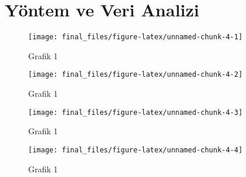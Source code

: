 \documentclass[
  12pt,
]{article}
\begin{document}
\hypertarget{yuxf6ntem-ve-veri-analizi}{%
\section{Yöntem ve Veri Analizi}\label{yuxf6ntem-ve-veri-analizi}}

\begin{figure}

{\centering \texttt{[image: final\_files/figure-latex/unnamed-chunk-4-1]} 

}

\caption{Grafik 1}\label{fig:unnamed-chunk-4-1}
\end{figure}
\begin{figure}

{\centering \texttt{[image: final\_files/figure-latex/unnamed-chunk-4-2]} 

}

\caption{Grafik 1}\label{fig:unnamed-chunk-4-2}
\end{figure}
\begin{figure}

{\centering \texttt{[image: final\_files/figure-latex/unnamed-chunk-4-3]} 

}

\caption{Grafik 1}\label{fig:unnamed-chunk-4-3}
\end{figure}
\begin{figure}

{\centering \texttt{[image: final\_files/figure-latex/unnamed-chunk-4-4]} 

}

\caption{Grafik 1}\label{fig:unnamed-chunk-4-4}
\end{figure}
\end{document}
